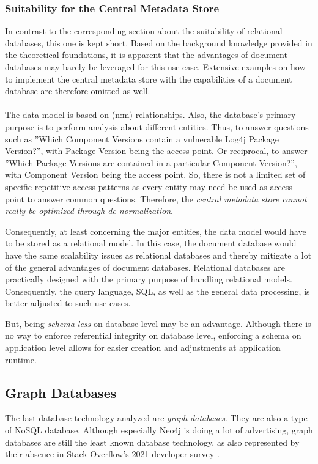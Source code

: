 \subsubsection{Suitability for the Central Metadata Store}
In contrast to the corresponding section about the suitability of relational databases, this one is kept short. Based on the background knowledge provided in the theoretical foundations, it is apparent that the advantages of document databases may barely be leveraged for this use case. Extensive examples on how to implement the central metadata store with the capabilities of a document database are therefore omitted as well.\\\\ 
The data model is based on (n:m)-relationships. Also, the database's primary purpose is to perform analysis about different entities. Thus, to answer questions such as ''Which Component Versions contain a vulnerable Log4j Package Version?'', with Package Version being the access point. Or reciprocal, to answer ''Which Package Versions are contained in a particular Component Version?'', with Component Version being the access point. So, there is not a limited set of specific repetitive access patterns as every entity may need be used as access point to answer common questions. Therefore, the \emph{central metadata store cannot really be optimized through de-normalization}.\par
Consequently, at least concerning the major entities, the data model would have to be stored as a relational model. In this case, the document database would have the same scalability issues as relational databases and thereby mitigate a lot of the general advantages of document databases. Relational databases are practically designed with the primary purpose of handling relational models. Consequently, the query language, SQL, as well as the general data processing, is better adjusted to such use cases.\par 
But, being \emph{schema-less} on database level may be an advantage. Although there is no way to enforce referential integrity on database level, enforcing a schema on application level allows for easier creation and adjustments at application runtime.

\subsection{Graph Databases}
The last database technology analyzed are \emph{graph databases}. They are also a type of NoSQL database. Although especially Neo4j is doing a lot of advertising, graph databases are still the least known database technology, as also represented by their absence in Stack Overflow's 2021 developer survey \cite{StackoverflowDeveloperSurvey}.

